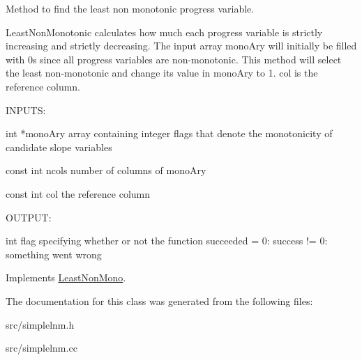 Method to find the least non monotonic progress variable. 

LeastNonMonotonic calculates how much each progress variable is strictly increasing and strictly decreasing. The input array monoAry will initially be filled with 0s since all progress variables are non-\/monotonic. This method will select the least non-\/monotonic and change its value in monoAry to 1. col is the reference column.

\begin{DoxyVerb}
INPUTS: 

int *monoAry      array containing integer flags that denote the monotonicity of candidate slope variables

const int ncols   number of columns of monoAry

const int col     the reference column

OUTPUT:

int               flag specifying whether or not the function succeeded 
                   = 0: success
		  != 0: something went wrong

\end{DoxyVerb}
 

Implements \hyperlink{classLeastNonMono_a239cbd7836950dc7c758138c4db00d0c}{LeastNonMono}.



The documentation for this class was generated from the following files:\begin{DoxyCompactItemize}
\item 
src/simplelnm.h\item 
src/simplelnm.cc\end{DoxyCompactItemize}
